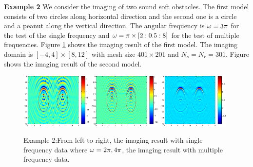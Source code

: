 \documentclass[12pt]{iopart}
\begin{document}
\bigskip
\textbf{Example 2} We consider the imaging of two sound soft obstacles. The first model
consists of two circles along horizontal direction and the second one is a circle and a
peanut along the vertical direction. The angular frequency is $\omega=3\pi$ for the test of the single frequency and $\omega=\pi\times[2:0.5:8]$ for the test of multiple frequencies. Figure \ref{figure_2} shows the imaging result of the first model. The
imaging domain is $[−4, 4] \times [8,12]$ with mesh size $401 \times 201$ and $N_s = N_r = 301$. Figure
 shows the imaging result of the second model. 
\begin{figure}
	\centering
	\includegraphics[width=0.32\textwidth]{./graphic/bi_circle_2pi.eps}
	\includegraphics[width=0.32\textwidth]{./graphic/bi_circle_4pi.eps}
	\includegraphics[width=0.32\textwidth]{./graphic/bi_circle.eps}
	
	\caption{Example 2:From left to right,  the imaging result
		with single frequency data where $\omega=2\pi,4\pi$, the imaging result with multiple frequency data.}\label{figure_2}
\end{figure}
\end{document}
